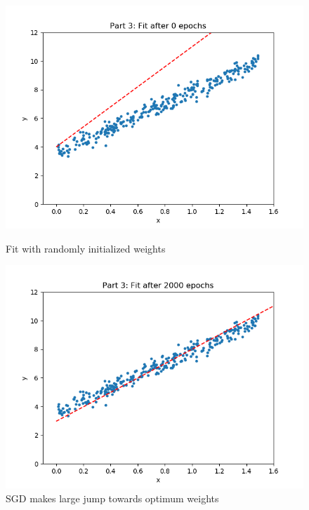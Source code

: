 \documentclass[paper=a4, fontsize=11pt]{scrartcl} %
\numberwithin{equation}{section} %
\numberwithin{figure}{section} %
\numberwithin{table}{section} %
\begin{document}
\begin{figure}[H]
    \includegraphics[width=\linewidth]{q2p31.png}
    \caption{Fit with randomly initialized weights}
    \label{fig:q2p31}
    \includegraphics[width=\linewidth]{q2p32.png}
    \caption{SGD makes large jump towards optimum weights}
    \label{fig:q2p32}
\end{figure}
\end{document}
